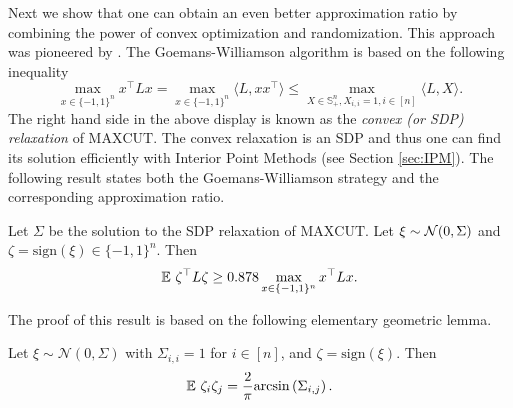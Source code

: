 Next we show that one can obtain an even better approximation ratio by combining the power of convex optimization and randomization. This approach was pioneered by \cite{GW95}. The Goemans-Williamson algorithm is based on the following inequality
$$\max_{x \in \{-1,1\}^n} x^{\top} L x = \max_{x \in \{-1,1\}^n} \langle L, xx^{\top} \rangle \leq \max_{X \in \mathbb{S}_+^n, X_{i,i}=1, i \in [n]} \langle L, X \rangle .$$ 
The right hand side in the above display is known as the {\em convex (or SDP) relaxation} of $\mathrm{MAXCUT}$. The convex relaxation is an SDP and thus one can find its solution efficiently with Interior Point Methods (see Section \ref{sec:IPM}). The following result states both the Goemans-Williamson strategy and the corresponding approximation ratio.

\begin{theorem} \label{th:GW}
Let $\Sigma$ be the solution to the SDP relaxation of $\mathrm{MAXCUT}$. Let $\xi \sim \mathcal{N}(0, \Sigma)$ and $\zeta = \mathrm{sign}(\xi) \in \{-1,1\}^n$. Then
$$\mathbb{E} \ \zeta^{\top} L \zeta \geq 0.878 \max_{x \in \{-1,1\}^n} x^{\top} L x .$$
\end{theorem}

The proof of this result is based on the following elementary geometric lemma.

\begin{lemma} \label{lem:GW}
Let $\xi \sim \mathcal{N}(0,\Sigma)$ with $\Sigma_{i,i}=1$ for $i \in [n]$, and $\zeta = \mathrm{sign}(\xi)$. Then
$$\mathbb{E} \ \zeta_i \zeta_j = \frac{2}{\pi} \mathrm{arcsin} \left(\Sigma_{i,j}\right) .$$
\end{lemma}

